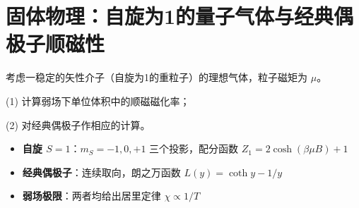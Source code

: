 \section{固体物理：自旋为1的量子气体与经典偶极子顺磁性}
\label{sec:spin1-classical-paramagnet}

\begin{modelbox}[题目：量子与经典顺磁磁化率]
考虑一稳定的矢性介子（自旋为1的重粒子）的理想气体，粒子磁矩为 $\mu$。

(1) 计算弱场下单位体积中的顺磁磁化率；

(2) 对经典偶极子作相应的计算。
\end{modelbox}

\begin{tipbox}[考点快速分析]
\begin{itemize}
    \item \textbf{自旋 $S=1$}：$m_S=-1,0,+1$ 三个投影，配分函数 $Z_1=2\cosh(\beta\mu B)+1$
    \item \textbf{经典偶极子}：连续取向，朗之万函数 $L(y)=\coth y-1/y$
    \item \textbf{弱场极限}：两者均给出居里定律 $\chi\propto1/T$
\end{itemize}
\end{tipbox}

